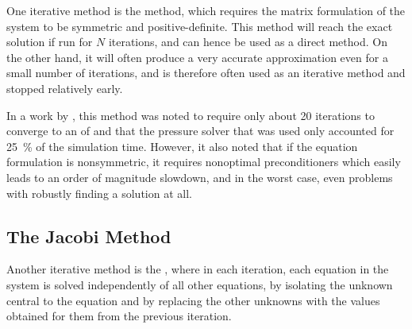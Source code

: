 
One iterative method is the \PCG method, which requires the matrix formulation of the system to be symmetric and positive-definite. This method will reach the exact solution if run for $N$ iterations, and can hence be used as a direct method. On the other hand, it will often produce a very accurate approximation even for a small number of iterations, and is therefore often used as an iterative method and stopped relatively early.

In a work by \citet{Losasso2004}, this method was noted to require only about 20 iterations to converge to an \accuracy of  and that the pressure solver that was used only accounted for \mbox{25 \%} of the simulation time. However, it also noted that if the equation formulation is nonsymmetric, it requires nonoptimal preconditioners which easily leads to an order of magnitude slowdown, and in the worst case, even problems with robustly finding a solution at all.

\subsection{The Jacobi Method}

Another iterative method is the , where in each iteration, each equation in the system is solved independently of all other equations, by isolating the unknown central to the equation and by replacing the other unknowns with the values obtained for them from the previous iteration.

